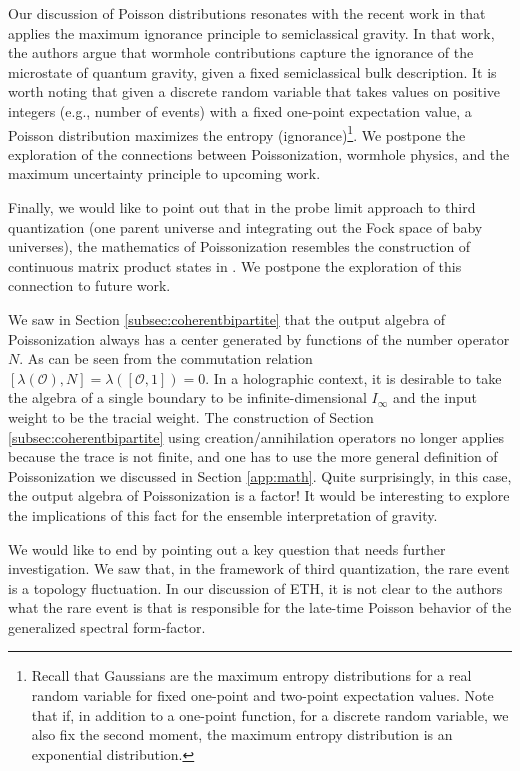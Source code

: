 \documentclass[a4paper,11pt]{article}
\theoremstyle{definition}
\numberwithin{equation}{section}
\begin{document}
Our discussion of Poisson distributions resonates with the recent work in \cite{de2024principle} that applies the maximum ignorance principle to semiclassical gravity. In that work, the authors argue that wormhole contributions capture the ignorance of the microstate of quantum gravity, given a fixed semiclassical bulk description. It is worth noting that given a discrete random variable that takes values on positive integers (e.g., number of events) with a fixed one-point expectation value, a Poisson distribution maximizes the entropy (ignorance)\footnote{Recall that Gaussians are the maximum entropy distributions for a real random variable for fixed one-point and two-point expectation values. Note that if, in addition to a one-point function, for a discrete random variable, we also fix the second moment, the maximum entropy distribution is an exponential distribution.}. We postpone the exploration of the connections between Poissonization, wormhole physics, and the maximum uncertainty principle to upcoming work.

Finally, we would like to point out that in the probe limit approach to third quantization (one parent universe and integrating out the Fock space of baby universes), the mathematics of Poissonization resembles the construction of continuous matrix product states in \cite{ganahl2017continuous,haegeman2013calculus}. We postpone the exploration of this connection to future work.

We saw in Section \ref{subsec:coherentbipartite} that the output algebra of Poissonization always has a center generated by functions of the number operator $N$. As can be seen from the commutation relation $[\lambda(\mathcal{O}),N]=\lambda([\mathcal{O},1])=0$.
In a holographic context, it is desirable to take the algebra of a single boundary to be infinite-dimensional $I_\infty$ and the input weight to be the tracial weight. The construction of Section \ref{subsec:coherentbipartite} using creation/annihilation operators no longer applies because the trace is not finite, and one has to use the more general definition of Poissonization we discussed in Section \ref{app:math}. Quite surprisingly, in this case, the output algebra of Poissonization is a factor! It would be interesting to explore the implications of this fact for the ensemble interpretation of gravity.

We would like to end by pointing out a key question that needs further investigation. We saw that, in the framework of third quantization, the rare event is a topology fluctuation. In our discussion of ETH, it is not clear to the authors what the rare event is that is responsible for the late-time Poisson behavior of the generalized spectral form-factor.
\end{document}
